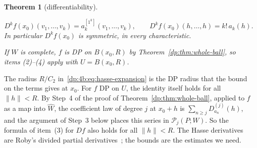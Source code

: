 \documentclass[11pt]{amsart}
\newtheorem{theorem}{Theorem}[section]
\theoremstyle{definition}
\theoremstyle{remark}
\numberwithin{equation}{section}
\newcommand{\norm}[1]{\lVert #1\rVert}
\theoremstyle{plain}
\theoremstyle{definition}
\theoremstyle{plain}
\newcommand{\cP}{\mathcal P}
\begin{document}
\begin{theorem}[differentiability]
\begin{enumerate}
\begin{equation}\label{dp:4b:eq:frechet-law}
 D^kf(x_0)(v_1,\dots,v_k)=a_k^{[1^k]}(v_1,\dots,v_k),\qquad D^kf(x_0)(h,\dots,h)=k!\,a_k(h).
\end{equation}
In particular $D^kf(x_0)$ is symmetric, in every characteristic.
\end{enumerate}
If $W$ is complete, $f$ is DP on $B(x_0,R)$ by Theorem~\ref{dp:thm:whole-ball}, so items \textup{(2)--(4)} apply with $U=B(x_0,R)$.
\end{theorem}

The radius $R/C_2$ in~\eqref{dp:4b:eq:hasse-expansion} is the DP radius that the bound on the terms gives at $x_0$. For $f$ DP on $U$, the identity itself holds for all $\norm h<R$. By Step~4 of the proof of Theorem~\ref{dp:thm:whole-ball}, applied to $f$ as a map into $\widehat W$, the coefficient law of degree $j$ at $x_0+h$ is $\sum_{n\ge j}D^{(j)}_{a_n}(h)$, and the argument of Step~3 below places this series in $\cP_j(P;W)$. So the formula of item~(3) for $Df$ also holds for all $\norm h<R$. The Hasse derivatives are Roby's divided partial derivatives~\cite[II~\S5]{Ro}; the bounds are the estimates we need.
\end{document}
